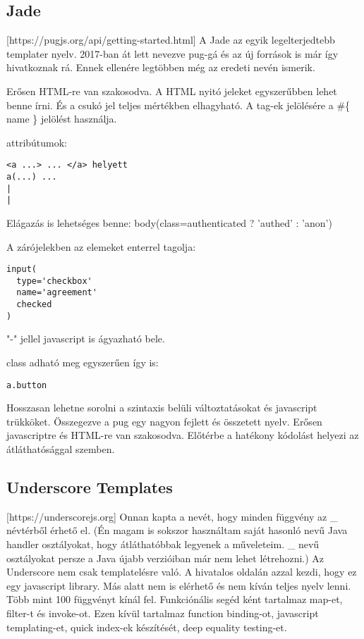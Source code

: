 \subsection{Jade}
[https://pugjs.org/api/getting-started.html]
A Jade az egyik legelterjedtebb templater nyelv.
2017-ban át lett nevezve pug-gá és az új források is már így hivatkoznak rá.
Ennek ellenére legtöbben még az eredeti nevén ismerik.

Erősen HTML-re van szakosodva.
A HTML nyitó jeleket egyszerűbben lehet benne írni.
És a csukó jel teljes mértékben elhagyható.
A tag-ek jelölésére a \#\{ name \} jelölést használja.

attribútumok:
\begin{verbatim}
<a ...> ... </a> helyett 
a(...) ...
|
|
\end{verbatim}

Elágazás is lehetséges benne: body(class=authenticated ? 'authed' : 'anon')

A zárójelekben az elemeket enterrel tagolja:
\begin{verbatim}
input(
  type='checkbox'
  name='agreement'
  checked
)
\end{verbatim}

"-" jellel javascript is ágyazható bele.

class adható meg egyszerűen így is:
\begin{verbatim}
a.button
\end{verbatim}

Hosszasan lehetne sorolni a szintaxis belüli változtatásokat és javascript trükköket.
Összegezve a pug egy nagyon fejlett és összetett nyelv.
Erősen javascriptre és HTML-re van szakosodva.
Előtérbe a hatékony kódolást helyezi az átláthatósággal szemben.


\subsection{Underscore Templates}
[https://underscorejs.org]
Onnan kapta a nevét, hogy minden függvény az \_ névtérből érhető el.
(Én magam is sokszor használtam saját hasonló nevű Java handler osztályokat, hogy átláthatóbbak legyenek a műveleteim. 
\_ nevű osztályokat persze a Java újabb verzióiban már nem lehet létrehozni.)
Az Underscore nem csak templatelésre való.
A hivatalos oldalán azzal kezdi, hogy ez egy javascript library.
Más alatt nem is elérhető és nem kíván teljes nyelv lenni.
Több mint 100 függvényt kínál fel.
Funkciónális segéd ként tartalmaz map-et, filter-t és invoke-ot.
Ezen kívül tartalmaz function binding-ot, javascript templating-et, quick index-ek készítését, deep equality testing-et.


